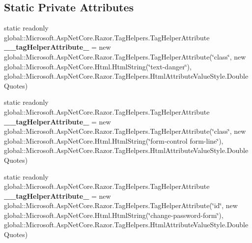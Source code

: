 \subsection*{Static Private Attributes}
\begin{DoxyCompactItemize}
\item 
\mbox{\label{class_projeto_e_s_w_1_1_areas_1_1_identity_1_1_pages_1_1_account_1_1_manage_1_1_areas___identityf71e623a7e7907515cd465c2fe005b76_a4c4a1d09366d9960bbb34387fb015e71}} 
static readonly global\+::\+Microsoft.\+Asp\+Net\+Core.\+Razor.\+Tag\+Helpers.\+Tag\+Helper\+Attribute {\bfseries \+\_\+\+\_\+tag\+Helper\+Attribute\+\_} = new global\+::\+Microsoft.\+Asp\+Net\+Core.\+Razor.\+Tag\+Helpers.\+Tag\+Helper\+Attribute(\char`\"{}class\char`\"{}, new global\+::\+Microsoft.\+Asp\+Net\+Core.\+Html.\+Html\+String(\char`\"{}text-\/danger\char`\"{}), global\+::\+Microsoft.\+Asp\+Net\+Core.\+Razor.\+Tag\+Helpers.\+Html\+Attribute\+Value\+Style.\+Double\+Quotes)
\item 
\mbox{\label{class_projeto_e_s_w_1_1_areas_1_1_identity_1_1_pages_1_1_account_1_1_manage_1_1_areas___identityf71e623a7e7907515cd465c2fe005b76_aca66c9b82c5bf895b7a662d794c2827e}} 
static readonly global\+::\+Microsoft.\+Asp\+Net\+Core.\+Razor.\+Tag\+Helpers.\+Tag\+Helper\+Attribute {\bfseries \+\_\+\+\_\+tag\+Helper\+Attribute\+\_} = new global\+::\+Microsoft.\+Asp\+Net\+Core.\+Razor.\+Tag\+Helpers.\+Tag\+Helper\+Attribute(\char`\"{}class\char`\"{}, new global\+::\+Microsoft.\+Asp\+Net\+Core.\+Html.\+Html\+String(\char`\"{}form-\/control form-\/line\char`\"{}), global\+::\+Microsoft.\+Asp\+Net\+Core.\+Razor.\+Tag\+Helpers.\+Html\+Attribute\+Value\+Style.\+Double\+Quotes)
\item 
\mbox{\label{class_projeto_e_s_w_1_1_areas_1_1_identity_1_1_pages_1_1_account_1_1_manage_1_1_areas___identityf71e623a7e7907515cd465c2fe005b76_a85aea7921d746397c9dfe3dec2a623e5}} 
static readonly global\+::\+Microsoft.\+Asp\+Net\+Core.\+Razor.\+Tag\+Helpers.\+Tag\+Helper\+Attribute {\bfseries \+\_\+\+\_\+tag\+Helper\+Attribute\+\_} = new global\+::\+Microsoft.\+Asp\+Net\+Core.\+Razor.\+Tag\+Helpers.\+Tag\+Helper\+Attribute(\char`\"{}id\char`\"{}, new global\+::\+Microsoft.\+Asp\+Net\+Core.\+Html.\+Html\+String(\char`\"{}change-\/password-\/form\char`\"{}), global\+::\+Microsoft.\+Asp\+Net\+Core.\+Razor.\+Tag\+Helpers.\+Html\+Attribute\+Value\+Style.\+Double\+Quotes)

\end{DoxyCompactItemize}
